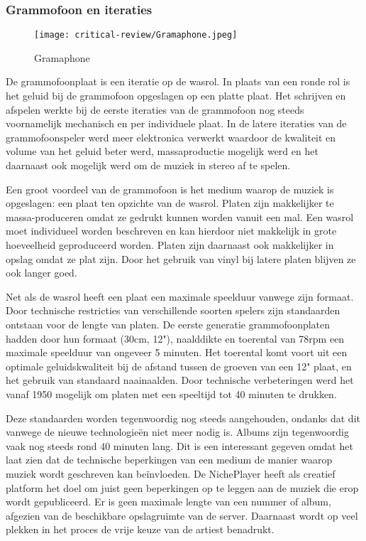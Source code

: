 
\subsubsection*{Grammofoon en iteraties}
\begin{wrapfigure}{r}{0.25\textwidth}
    \centering
    \texttt{[image: critical-review/Gramaphone.jpeg]}
    \caption{Gramaphone}
    \label{fig:critical-review:Gramaphone}
\end{wrapfigure}
De grammofoonplaat is een iteratie op de wasrol. In plaats van een ronde rol is het geluid bij de grammofoon opgeslagen op een platte plaat. Het schrijven en afspelen werkte bij de eerste iteraties van de grammofoon nog steeds voornamelijk mechanisch en per individuele plaat. In de latere iteraties van de grammofoonspeler werd meer elektronica verwerkt waardoor de kwaliteit en volume van het geluid beter werd, massaproductie mogelijk werd en het daarnaast ook mogelijk werd om de muziek in stereo af te spelen.

Een groot voordeel van de grammofoon is het medium waarop de muziek is opgeslagen: een plaat ten opzichte van de wasrol. Platen zijn makkelijker te massa-produceren omdat ze gedrukt kunnen worden vanuit een mal. Een wasrol moet individueel worden beschreven en kan hierdoor niet makkelijk in grote hoeveelheid geproduceerd worden. Platen zijn daarnaast ook makkelijker in opslag omdat ze plat zijn. Door het gebruik van vinyl bij latere platen blijven ze ook langer goed.

Net als de wasrol heeft een plaat een maximale speelduur vanwege zijn formaat. Door technische restricties van verschillende soorten spelers zijn standaarden ontstaan voor de lengte van platen. De eerste generatie grammofoonplaten hadden door hun formaat (30cm, 12"), naalddikte en toerental van 78rpm een maximale speelduur van ongeveer 5 minuten. Het toerental komt voort uit een optimale geluidskwaliteit bij de afstand tussen de groeven van een 12" plaat, en het gebruik van standaard naainaalden. Door technische verbeteringen werd het vanaf 1950 mogelijk om platen met een speeltijd tot 40 minuten te drukken. 

Deze standaarden worden tegenwoordig nog steeds aangehouden, ondanks dat dit vanwege de nieuwe technologieën niet meer nodig is. Albums zijn tegenwoordig vaak nog steeds rond 40 minuten lang. Dit is een interessant gegeven omdat het laat zien dat de technische beperkingen van een medium de manier waarop muziek wordt geschreven kan beïnvloeden. De NichePlayer heeft als creatief platform het doel om juist geen beperkingen op te leggen aan de muziek die erop wordt gepubliceerd. Er is geen maximale lengte van een nummer of album, afgezien van de beschikbare opslagruimte van de server. Daarnaast wordt op veel plekken in het proces de vrije keuze van de artiest benadrukt.

